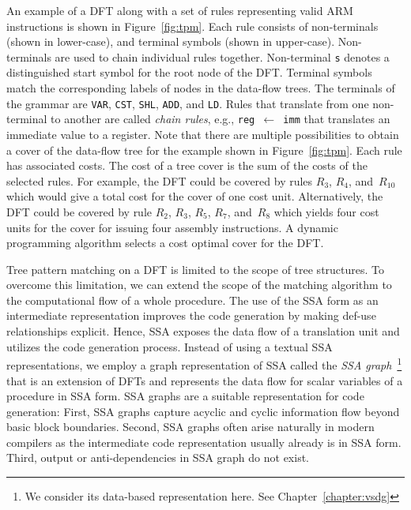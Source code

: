 An example of a DFT along with a set of rules representing valid ARM
instructions is shown in Figure~\ref{fig:tpm}. Each rule consists of
non-terminals (shown in lower-case), and terminal symbols (shown in
upper-case). Non-terminals are used to chain individual rules together.
Non-terminal \texttt{s} denotes a distinguished start symbol for the
root node of the DFT. Terminal symbols match the corresponding labels
of nodes in the data-flow trees. The terminals of the grammar are
\texttt{VAR}, \texttt{CST}, \texttt{SHL}, \texttt{ADD}, and
\texttt{LD}.  Rules that translate from one non-terminal to another are
called \emph{chain rules}, e.g., \texttt{reg $\gets$ imm} that translates
an immediate value to a register. Note that there are multiple
possibilities to obtain a cover of the data-flow tree for the example
shown in Figure~\ref{fig:tpm}.  Each rule has associated costs. The
cost of a tree cover is the sum of the costs of the selected
rules. For example, the DFT could be covered by rules $R_3$, $R_4$, and~$R_{10}$ which would give a total cost for the cover of one cost
unit. Alternatively, the DFT could be covered by rule $R_2$, $R_3$, $R_5$, $R_7$, and~$R_8$ which yields four cost units for the cover for issuing four assembly
instructions. A dynamic programming algorithm selects a cost optimal
cover for the DFT.


Tree pattern matching on a DFT is limited to the scope of tree
structures.  To overcome this limitation, we can extend the scope of
the matching algorithm to the computational flow of a whole procedure.
The use of the SSA form as an intermediate
representation improves the code generation by making def-use
relationships explicit. Hence, SSA exposes the data flow of a
translation unit and utilizes the code generation process.  Instead of
using a textual SSA representations, we employ a graph representation
of SSA called the \emph{SSA graph}~\footnote{We consider its
  data-based representation here. See Chapter~\ref{chapter:vsdg}} that
is an extension of DFTs and represents the data flow for scalar
variables of a procedure in SSA form.  SSA graphs are a suitable
representation for code generation: First, SSA graphs capture acyclic
and cyclic information flow beyond basic block boundaries. Second, SSA
graphs often arise naturally in modern compilers as the intermediate
code representation usually already is in SSA form. Third, output or
anti-dependencies in SSA graph do not exist.

